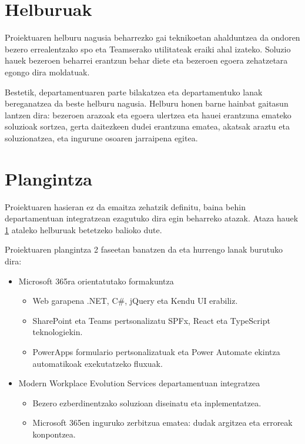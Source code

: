 \section{Helburuak}\label{sec:helburuak}
Proiektuaren helburu nagusia beharrezko gai teknikoetan ahalduntzea da ondoren bezero errealentzako \acrfull{spo} eta Teamserako utilitateak eraiki ahal izateko. Soluzio hauek bezeroen beharrei erantzun behar diete eta bezeroen egoera zehatzetara egongo dira moldatuak.

Bestetik, departamentuaren parte bilakatzea eta departamentuko lanak bereganatzea da beste helburu nagusia. Helburu honen barne hainbat gaitasun lantzen dira: bezeroen arazoak eta egoera ulertzea eta hauei erantzuna emateko soluzioak sortzea, gerta daitezkeen dudei erantzuna ematea, akatsak araztu eta soluzionatzea, eta ingurune osoaren jarraipena egitea. 

\section{Plangintza}
Proiektuaren hasieran ez da emaitza zehatzik definitu, baina behin departamentuan integratzean ezagutuko dira egin beharreko atazak. Ataza hauek \ref{sec:helburuak} ataleko helburuak betetzeko balioko dute. 

Proiektuaren plangintza 2 faseetan banatzen da eta hurrengo lanak burutuko dira:
\begin{itemize}
    \item Microsoft 365ra orientatutako formakuntza
    \begin{itemize}
        \item Web garapena .NET, C\#, jQuery eta Kendu UI erabiliz. 
        \item SharePoint eta Teams pertsonalizatu SPFx, React eta TypeScript teknologiekin.
        \item PowerApps formulario pertsonalizatuak eta Power Automate ekintza automatikoak exekutatzeko fluxuak.
    \end{itemize}
    \item Modern Workplace Evolution Services departamentuan integratzea
    \begin{itemize}
        \item Bezero ezberdinentzako soluzioan diseinatu eta inplementatzea. 
        \item Microsoft 365en inguruko zerbitzua ematea: dudak argitzea eta erroreak konpontzea.
    \end{itemize}
\end{itemize}


